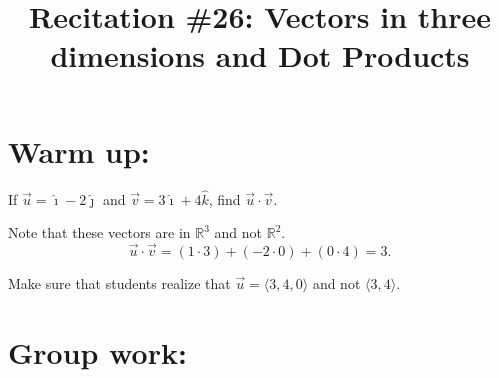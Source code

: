 \documentclass[handout]{ximera}
\title{Recitation \#26: Vectors in three dimensions and Dot Products}
\begin{document}
\begin{abstract}		\end{abstract}
\maketitle


\section{Warm up:}
If $\vec{u} = \hat{\imath} - 2 \hat{\jmath}$ and $\vec{v} = 3 \hat{\imath} + 4 \hat{k}$, find $\vec{u} \cdot \vec{v}$.
	\begin{freeResponse}
	Note that these vectors are in $\mathbb{R}^3$ and not $\mathbb{R}^2$.
	\[
	\vec{u} \cdot \vec{v} = (1 \cdot 3) + (-2 \cdot 0) + (0 \cdot 4) = \boxed{3}.
	\]
	\end{freeResponse}
	
\begin{instructorNotes}
Make sure that students realize that $\vec{u} = \langle 3,4,0 \rangle$ and not $\langle 3,4 \rangle$.
\end{instructorNotes}







\section{Group work:}
\end{document}
